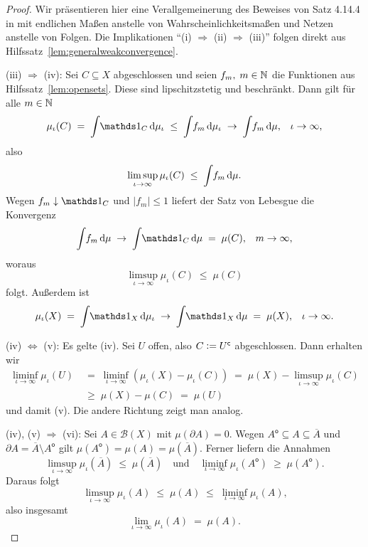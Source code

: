 \documentclass[../main/main.tex]{subfiles}
\begin{document}
	\begin{proof}
		Wir präsentieren hier eine Verallgemeinerung des Beweises von Satz 4.14.4 in \cite[Kapitel 4.14]{Simon.2015} mit endlichen Maßen 
		anstelle von Wahrscheinlichkeitsmaßen und Netzen anstelle von Folgen. Die Implikationen \enquote{(i) $\Rightarrow$ (ii) $\Rightarrow$ (iii)} folgen 
		direkt aus Hilfssatz~\ref{lem:generalweakconvergence}. 
		
		(iii) $\Rightarrow$ (iv): Sei $C \subseteq X$ abgeschlossen und seien 
		$f_m, \; m \in \mathbb{N}$ die Funktionen aus Hilfssatz~\ref{lem:opensets}. 
		Diese sind lipschitzstetig und beschränkt.
		Dann gilt für alle $m \in \mathbb{N}$
		$$\mu_\iota(C) \; = \; \measureint{}{\indfct_C}{\mu_\iota} \; \leq \; 
		\measureint{}{f_m}{\mu_\iota} \; \to \;
		\measureint{}{f_m}{\mu} \text{,} \quad \iota \to \infty \text{,}$$
		also 
		$$\limsup_{\iota \to \infty} \mu_\iota(C) \; \leq \; 
		\int_{} \, f_m \, \mathrm{d}\mu \text{.}$$
		Wegen $f_m \convdown \indfct_C$ und $| f_m | \leq 1$ 
		liefert der Satz von Lebesgue die Konvergenz
		$$\measureint{}{f_m}{\mu} \; \to \;
		\measureint{}{\indfct_C}{\mu} \; = \; \mu(C) \text{,} 
		\quad m \to \infty \text{,}$$
		woraus
		$$\limsup_{\iota \to \infty} \mu_\iota(C) \; \leq \; \mu(C)$$
		folgt. Außerdem ist 
		$$\mu_\iota(X) \; = \; \measureint{}{\indfct_{X}}{\mu_\iota} \; \to \; \measureint{}{\indfct_{X}}{\mu} \; = \; \mu(X) \text{,} 
		\quad \iota \to \infty \text{.}$$
		
		(iv) $\Leftrightarrow$ (v): Es gelte (iv). Sei $U$ offen, also 
		$C \vcentcolon = U^\mathsf{c}$ abgeschlossen. Dann erhalten wir
		\begin{align*}
			\liminf_{\iota \to \infty} \mu_\iota(U) \; &= \; \liminf_{\iota \to \infty} (\mu_\iota(X) - \mu_\iota(C)) \; = \;
			\mu(X) - \limsup_{\iota \to \infty} \mu_\iota(C) \\
			&\geq \; 
			\mu(X) - \mu(C) \; = \; \mu(U)
		\end{align*}
		und damit (v). Die andere Richtung zeigt man analog.
		
		(iv), (v) $\Rightarrow$ (vi): Sei $A \in \mathcal{B}(X)$ mit 
		$\mu(\partial A) = 0$. Wegen
		$A^\mathsf{o} \subseteq A \subseteq \overline{A}$ und 
		$\partial A = \overline{A} \setminus A^\mathsf{o}$ gilt $\mu(A^\mathsf{o}) = 
		\mu(A) = \mu(\overline{A}) \text{.}$
		Ferner liefern die Annahmen
		$$\limsup_{\iota \to \infty} \mu_\iota(\overline{A}) \; \leq \; 
		\mu(\overline{A}) \quad \text{und} \quad 
		\liminf_{\iota \to \infty} \mu_\iota(A^\mathsf{o}) \; \geq \; 
		\mu(A^\mathsf{o}) \text{.}$$
		Daraus folgt
		$$\limsup_{\iota \to \infty} \mu_\iota(A) \; \leq \; 
		\mu(A) \; \leq \; \liminf_{\iota \to \infty} \mu_\iota(A) \text{,}$$
		also insgesamt
		$$\lim_{\iota \to \infty} \mu_\iota(A) \; = \; \mu(A) \text{.}$$
		

\end{proof}
\end{document}
